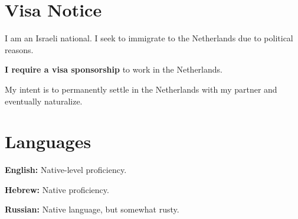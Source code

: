 \documentclass[a4paper,11pt]{article}
\begin{document}
\section{Visa Notice}
\begin{itemList}
\item I am an Israeli national. I seek to immigrate to the
  Netherlands due to political reasons.
\item \textbf{I require a visa sponsorship} to work in the Netherlands.
\item My intent is to permanently settle in the Netherlands with my
  partner and eventually naturalize.
\end{itemList}
\section{Languages}
\begin{itemList}
\item \textbf{English:} Native-level proficiency.
\item \textbf{Hebrew:} Native proficiency.
\item \textbf{Russian:} Native language, but somewhat rusty.
\end{itemList}
\end{document}
